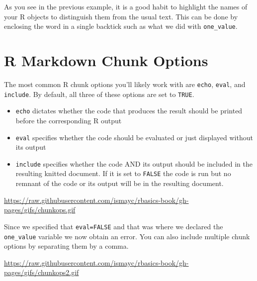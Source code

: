 \documentclass[]{tufte-book}
\begin{document}
As you see in the previous example, it is a good habit to highlight the
names of your R objects to distinguish them from the usual text. This
can be done by enclosing the word in a single backtick such as what we
did with \texttt{one\_value}.

\section{R Markdown Chunk Options}\label{r-markdown-chunk-options}

The most common R chunk options you'll likely work with are
\texttt{echo}, \texttt{eval}, and \texttt{include}. By default, all
three of these options are set to \texttt{TRUE}.

\begin{itemize}
\item
  \texttt{echo} dictates whether the code that produces the result
  should be printed before the corresponding R output
\item
  \texttt{eval} specifies whether the code should be evaluated or just
  displayed without its output
\item
  \texttt{include} specifies whether the code AND its output should be
  included in the resulting knitted document. If it is set to
  \texttt{FALSE} the code is run but no remnant of the code or its
  output will be in the resulting document.
\end{itemize}

\vspace{0.1in}

\begin{center}\footnotesize{\url{https://raw.githubusercontent.com/ismayc/rbasics-book/gh-pages/gifs/chunkops.gif}}\end{center}

\vspace{0.1in}

Since we specified that \texttt{eval=FALSE} and that was where we
declared the \texttt{one\_value} variable we now obtain an error. You
can also include multiple chunk options by separating them by a comma.

\vspace{0.1in}

\begin{center}\footnotesize{\url{https://raw.githubusercontent.com/ismayc/rbasics-book/gh-pages/gifs/chunkops2.gif}}\end{center}

\vspace{0.1in}
\end{document}

